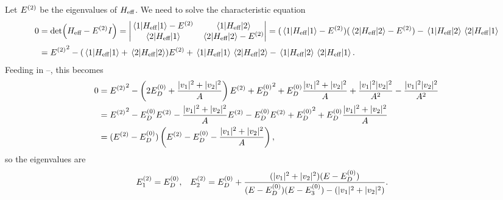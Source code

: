 \begin{solution}
	Let $E^{(2)}$ be the eigenvalues of $H_\text{eff}$.  We need to solve the characteristic equation
	\begin{align*}
		0 &= \det(\Heff - \Esw I)
		= \mqty| \mel{1}{\Heff}{1} - \Esw & \mel{1}{\Heff}{2} \\ \mel{2}{\Heff}{1} & \mel{2}{\Heff}{2} - \Esw |
		= (\mel{1}{\Heff}{1} - \Esw) (\mel{2}{\Heff}{2} - \Esw) - \mel{1}{\Heff}{2} \mel{2}{\Heff}{1} \\
		&= {\Esw}^2 - (\mel{1}{\Heff}{1} + \mel{2}{\Heff}{2}) \Esw + \mel{1}{\Heff}{1} \mel{2}{\Heff}{2} - \mel{1}{\Heff}{2} \mel{2}{\Heff}{1}.
	\end{align*}
	Feeding in --, this becomes
	\begin{align*}
		0 &= {E^{(2)}}^2 - \left( 2E^{(0)}_D + \frac{|v_1|^2 + |v_2|^2}{A} \right) E^{(2)} + {E^{(0)}_D}^2 + E^{(0)}_D \frac{|v_1|^2 + |v_2|^2}{A} + \frac{|v_1|^2 |v_2|^2}{A^2} - \frac{|v_1|^2 |v_2|^2}{A^2} \\
		&= {E^{(2)}}^2 - E^{(0)}_D E^{(2)} - \frac{|v_1|^2 + |v_2|^2}{A} E^{(2)} - E^{(0)}_D E^{(2)} + {E^{(0)}_D}^2 + E^{(0)}_D \frac{|v_1|^2 + |v_2|^2}{A} \\
		&= (E^{(2)} - E^{(0)}_D) \left( E^{(2)} - E^{(0)}_D - \frac{|v_1|^2 + |v_2|^2}{A} \right),
	\end{align*}
	so the eigenvalues are
	\begin{align*}
		E^{(2)}_1 &= E^{(0)}_D, &
		E^{(2)}_2 &= E^{(0)}_D + \frac{(|v_1|^2 + |v_2|^2) (E - E^{(0)}_D)}{(E - E^{(0)}_D) (E - E^{(0)}_3) - (|v_1|^2 + |v_2|^2)}.
	\end{align*}
	

\end{solution}
